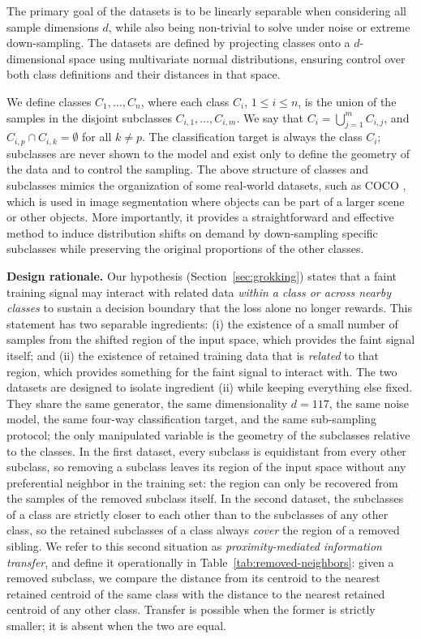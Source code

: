 ﻿\documentclass[../ppgc-tese.tex]{subfiles}
\begin{document}
The primary goal of the datasets is to be linearly separable when considering all sample dimensions $d$, while also being non-trivial to solve under noise or extreme down-sampling. The datasets are defined by projecting classes onto a $d$-dimensional space using multivariate normal distributions, ensuring control over both class definitions and their distances in that space.

We define classes $C_1, \dots, C_n$, where each class $C_i$, $1 \leq i \leq n$, is the union of the samples in the disjoint subclasses $C_{i,1}, \dots, C_{i,m}$. We say that $C_i = \bigcup_{j=1}^{m} C_{i,j}$, and $C_{i,p} \cap C_{i,k} = \emptyset$ for all $k \neq p$. The classification target is always the class $C_i$; subclasses are never shown to the model and exist only to define the geometry of the data and to control the sampling. The above structure of classes and subclasses mimics the organization of some real-world datasets, such as COCO \cite{lin2014COCO}, which is used in image segmentation where objects can be part of a larger scene or other objects. More importantly, it provides a straightforward and effective method to induce distribution shifts on demand by down-sampling specific subclasses while preserving the original proportions of the other classes.

\noindent\textbf{Design rationale.}
Our hypothesis (Section~\ref{sec:grokking}) states that a faint training signal may interact with related data \emph{within a class or across nearby classes} to sustain a decision boundary that the loss alone no longer rewards. This statement has two separable ingredients: (i) the existence of a small number of samples from the shifted region of the input space, which provides the faint signal itself; and (ii) the existence of retained training data that is \emph{related} to that region, which provides something for the faint signal to interact with. The two datasets are designed to isolate ingredient (ii) while keeping everything else fixed. They share the same generator, the same dimensionality $d = 117$, the same noise model, the same four-way classification target, and the same sub-sampling protocol; the only manipulated variable is the geometry of the subclasses relative to the classes. In the first dataset, every subclass is equidistant from every other subclass, so removing a subclass leaves its region of the input space without any preferential neighbor in the training set: the region can only be recovered from the samples of the removed subclass itself. In the second dataset, the subclasses of a class are strictly closer to each other than to the subclasses of any other class, so the retained subclasses of a class always \emph{cover} the region of a removed sibling. We refer to this second situation as \emph{proximity-mediated information transfer}, and define it operationally in Table~\ref{tab:removed-neighbors}: given a removed subclass, we compare the distance from its centroid to the nearest retained centroid of the same class with the distance to the nearest retained centroid of any other class. Transfer is possible when the former is strictly smaller; it is absent when the two are equal.
\end{document}
